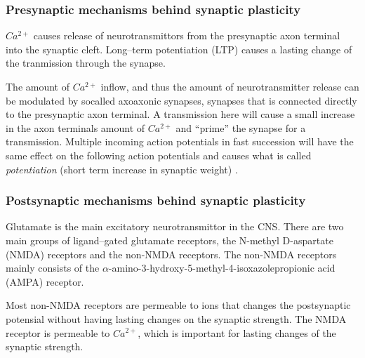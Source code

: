 \subsubsection{Presynaptic mechanisms behind synaptic plasticity}
$Ca^{2+}$ causes release of neurotransmittors from the presynaptic axon terminal into the synaptic cleft\cite{PrinciplesOfNeuralScience4edKAP10}. 
Long--term potentiation (LTP) causes a lasting change of the tranmission through the synapse.%

The amount of $Ca^{2+}$ inflow, and thus the amount of neurotransmitter release can be modulated by socalled axoaxonic synapses\cite{NeuroscienceExploringTheBrain3edKAP5}, synapses that is connected directly to the presynaptic axon terminal. 
A transmission here will cause a small increase in the axon terminals amount of $Ca^{2+}$ and ``prime'' the synapse for a transmission. 
Multiple incoming action potentials in fast succession will have the same effect on the following action potentials and causes what is called \emph{potentiation} (short term increase in synaptic weight)
\cite{PrinciplesOfNeuralScience4edKAP14}. 




\subsubsection{Postsynaptic mechanisms behind synaptic plasticity}
Glutamate is the main excitatory neurotransmittor in the CNS\cite{PrinciplesOfAnatomyAndPhysiology12edKAP12}. %
There are two main groups of ligand--gated glutamate receptors, the N-methyl D-aspartate (NMDA) receptors and the non-NMDA receptors. 
The non-NMDA receptors mainly consists of the $\alpha$-amino-3-hydroxy-5-methyl-4-isoxazolepropionic acid (AMPA) receptor. %

Most non-NMDA receptors are permeable to ions that changes the postsynaptic potensial without having lasting changes on the synaptic strength.%
The NMDA receptor is permeable to $Ca^{2+}$, which is important for lasting changes of the synaptic strength. %

